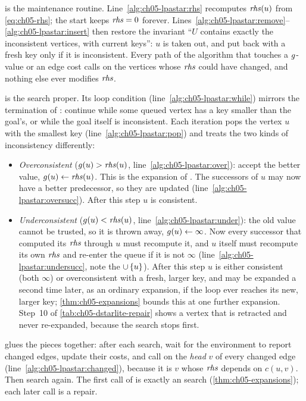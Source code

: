  is the maintenance routine. Line~\ref{alg:ch05-lpastar:rhs}
recomputes $\mathit{rhs}(u)$ from \cref{eq:ch05-rhs}; the start keeps $\mathit{rhs}=0$ forever.
Lines~\ref{alg:ch05-lpastar:remove}--\ref{alg:ch05-lpastar:insert} then restore the
invariant ``$U$ contains exactly the inconsistent vertices, with current keys'': $u$ is
taken out, and put back with a fresh key only if it is inconsistent. Every path of the
algorithm that touches a $g$-value or an edge cost calls \LpaUpdateVertex on the
vertices whose $\mathit{rhs}$ could have changed, and nothing else ever modifies $\mathit{rhs}$.

\LpaComputeShortestPath is the search proper. Its loop condition
(line~\ref{alg:ch05-lpastar:while}) mirrors the termination of \astar: continue while
some queued vertex has a key smaller than the goal's, or while the goal itself is
inconsistent. Each iteration pops the vertex $u$ with the smallest key
(line~\ref{alg:ch05-lpastar:pop}) and treats the two kinds of inconsistency
differently:
\begin{itemize}
  \item \emph{Overconsistent} ($g(u) > \mathit{rhs}(u)$, line~\ref{alg:ch05-lpastar:over}):
    accept the better value, $g(u)\gets\mathit{rhs}(u)$. This is the expansion of \astar.
    The successors of $u$ may now have a better predecessor, so they are updated
    (line~\ref{alg:ch05-lpastar:oversucc}). After this step $u$ is consistent.
  \item \emph{Underconsistent} ($g(u) < \mathit{rhs}(u)$, line~\ref{alg:ch05-lpastar:under}):
    the old value cannot be trusted, so it is thrown away, $g(u)\gets\infty$.
    Now every successor that computed its $\mathit{rhs}$ through $u$ must recompute it, and $u$
    itself must recompute its own $\mathit{rhs}$ and re-enter the queue if it is not $\infty$
    (line~\ref{alg:ch05-lpastar:undersucc}, note the $\cup\left\{ u \right\}$). After this step $u$
    is either consistent (both $\infty$) or overconsistent with a fresh, larger key, and
    may be expanded a second time later, as an ordinary \astar expansion, if the loop
    ever reaches its new, larger key; \cref{thm:ch05-expansions} bounds this at one
    further expansion. Step~10 of \cref{tab:ch05-dstarlite-repair} shows a vertex that is
    retracted and never re-expanded, because the search stops first.
\end{itemize}

\LpaMain glues the pieces together: after each search, wait for the environment to
report changed edges, update their costs, and call \LpaUpdateVertex on the \emph{head}
$v$ of every changed edge (line~\ref{alg:ch05-lpastar:changed}), because it is $v$
whose $\mathit{rhs}$ depends on $c(u,v)$. Then search again. The first call of
\LpaComputeShortestPath is exactly an \astar search (\cref{thm:ch05-expansions}); each
later call is a repair.

